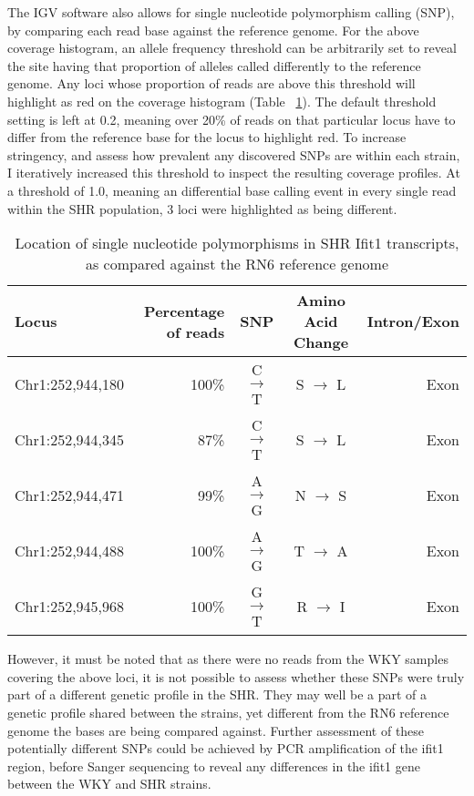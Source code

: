The IGV software also allows for single nucleotide polymorphism calling (SNP), by comparing each read base against the reference genome. For the above coverage histogram, an allele frequency threshold can be arbitrarily set to reveal the site having that proportion of alleles called differently to the reference genome. Any loci whose proportion of reads are above this threshold will highlight as red on the coverage histogram (Table ~\ref{fig:SNPS}). The default threshold setting is left at 0.2, meaning over 20\% of reads on that particular locus have to differ from the reference base for the locus to highlight red. To increase stringency, and assess how prevalent any discovered SNPs are within each strain, I iteratively increased this threshold to inspect the resulting coverage profiles. At a threshold of 1.0, meaning an differential base calling event in every single read within the SHR population, 3 loci were highlighted as being different. \\

\begin{table}[!htbp]
\centering
\scriptsize
\begin{tabular}{lrccr}
Locus            & Percentage of reads & SNP   & Amino Acid Change & Intron/Exon \\
\hline
Chr1:252,944,180 & 100\% &  C $\rightarrow$ T & S $\rightarrow$ L & Exon \\
Chr1:252,944,345 & 87\%  &  C $\rightarrow$ T & S $\rightarrow$ L & Exon \\
Chr1:252,944,471 & 99\%  &  A $\rightarrow$ G & N $\rightarrow$ S & Exon \\
Chr1:252,944,488 & 100\% &  A $\rightarrow$ G & T $\rightarrow$ A & Exon \\
Chr1:252,945,968 & 100\% &  G $\rightarrow$ T & R $\rightarrow$ I & Exon \\
\end{tabular}
\caption{Location of single nucleotide polymorphisms in SHR Ifit1 transcripts, as compared against the RN6 reference genome}
\label{fig:SNPS}
\end{table}

However, it must be noted that as there were no reads from the WKY samples covering the above loci, it is not possible to assess whether these SNPs were truly part of a different genetic profile in the SHR. They may well be a part of a genetic profile shared between the strains, yet different from the RN6 reference genome the bases are being compared against. Further assessment of these potentially different SNPs could be achieved by PCR amplification of the ifit1 region, before Sanger sequencing to reveal any differences in the ifit1 gene between the WKY and SHR strains.  

